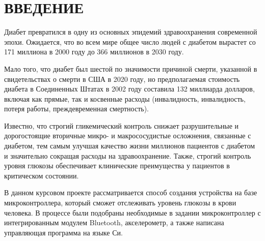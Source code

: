 \begin{sloppypar} %
\newpage %
\section*{ВВЕДЕНИЕ} %
Диабет превратился в одну из основных эпидемий здравоохранения современной эпохи. Ожидается, что во всем мире общее число людей с диабетом вырастет со 171 миллиона в 2000 году до 366 миллионов в 2030 году.\cite{ADXL}

Мало того, что диабет был шестой по значимости причиной смерти, указанной в свидетельствах о смерти в США в 2020 году, но предполагаемая стоимость диабета в Соединенных Штатах в 2002 году составила 132 миллиарда долларов, включая как прямые, так и косвенные расходы (инвалидность, инвалидность, потеря работы, преждевременная смертность).

Известно, что строгий гликемический контроль снижает разрушительные и дорогостоящие вторичные микро- и макрососудистые осложнения, связанные с диабетом, тем самым улучшая качество жизни миллионов пациентов с диабетом и значительно сокращая расходы на здравоохранение. Также, строгий контроль уровня глюкозы обеспечивает клинические преимущества у пациентов в критическом состоянии.

В данном курсовом проекте  рассматривается способ создания устройства на базе микроконтроллера, который сможет отслеживать уровень глюкозы в крови человека.  В процессе были подобраны необходимые в задании микроконтроллер с интегрированным модулем Bluetooth, акселерометр, а также написана управляющая программа на языке Си. 



\end{sloppypar}
